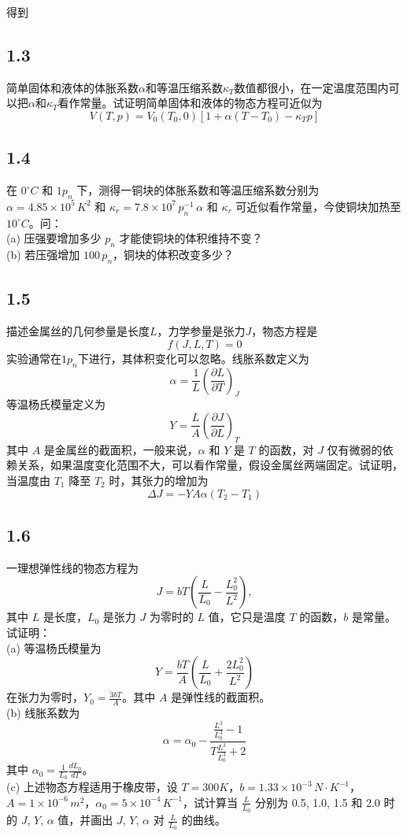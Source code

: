 得到




\newpage
\subsection{1.3}
简单固体和液体的体胀系数$\alpha$和等温压缩系数$\kappa_T$数值都很小，在一定温度范围内可以把$\alpha$和$\kappa_T$看作常量。试证明简单固体和液体的物态方程可近似为
$$
V(T, p) = V_0 (T_0, 0) [1 + \alpha (T - T_0) - \kappa_T p]
$$

\newpage
\subsection{1.4}
在 $0^\circ C$ 和 $1 p_n$ 下，测得一铜块的体胀系数和等温压缩系数分别为 $\alpha = 4.85 \times 10^5 \, K^2$ 和 $\kappa_r = 7.8 \times 10^7 \, p_n^{-1} \, \alpha$ 和 $\kappa_r$ 可近似看作常量，今使铜块加热至 $10^\circ C$。问：\\
(a) 压强要增加多少 $p_n$ 才能使铜块的体积维持不变？ \\
(b) 若压强增加 $100 \, p_n$，铜块的体积改变多少？

\newpage
\subsection{1.5}
描述金属丝的几何参量是长度$L$，力学参量是张力$J$，物态方程是
$$
f(J, L, T) = 0
$$
实验通常在$1p_n$下进行，其体积变化可以忽略。线胀系数定义为
$$
\alpha = \frac{1}{L} \left( \frac{\partial L}{\partial T} \right)_J
$$
等温杨氏模量定义为
$$
Y = \frac{L}{A} \left( \frac{\partial J}{\partial L} \right)_T
$$
其中 $A$ 是金属丝的截面积，一般来说，$\alpha$ 和 $Y$ 是 $T$ 的函数，对 $J$ 仅有微弱的依赖关系，如果温度变化范围不大，可以看作常量，假设金属丝两端固定。试证明，当温度由 $T_1$ 降至 $T_2$ 时，其张力的增加为
$$
\Delta J = -YA\alpha (T_2 - T_1)
$$

\newpage
\subsection{1.6}
一理想弹性线的物态方程为
$$
J = bT \left( \frac{L}{L_0} - \frac{L_0^2}{L^2} \right),
$$
其中 $L$ 是长度，$L_0$ 是张力 $J$ 为零时的 $L$ 值，它只是温度 $T$ 的函数，$b$ 是常量。试证明：\\
(a) 等温杨氏模量为
$$
Y = \frac{bT}{A} \left( \frac{L}{L_0} + \frac{2L_0^2}{L^2} \right)
$$
在张力为零时，$Y_0 = \frac{3bT}{A}$。其中 $A$ 是弹性线的截面积。\\
(b) 线胀系数为
$$
\alpha = \alpha_0 - \frac{\frac{L^3}{L_0^3} - 1}{T \frac{L^3}{L_0^3} + 2}
$$
其中 $\alpha_0 = \frac{1}{L_0} \frac{dL_0}{dT}$。\\
(c) 上述物态方程适用于橡皮带，设 $T = 300K$，$b = 1.33 \times 10^{-3} \, N \cdot K^{-1}$，$A = 1 \times 10^{-6} \, m^2$，$\alpha_0 = 5 \times 10^{-4} \, K^{-1}$，试计算当 $\frac{L}{L_0}$ 分别为 0.5, 1.0, 1.5 和 2.0 时的 $J$, $Y$, $\alpha$ 值，并画出 $J$, $Y$, $\alpha$ 对 $\frac{L}{L_0}$ 的曲线。

